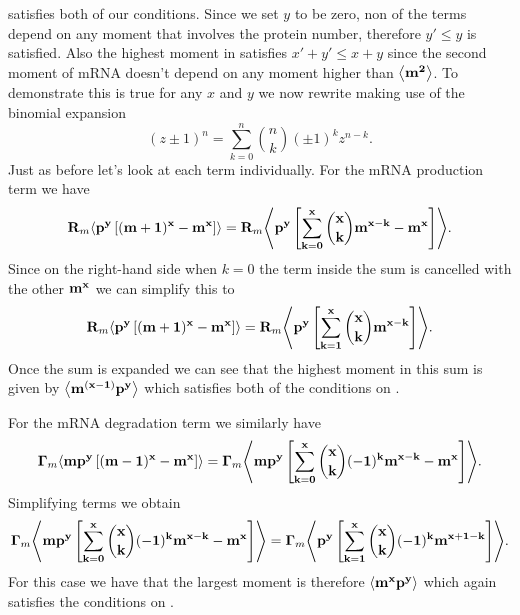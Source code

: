  satisfies both of our conditions. Since we set $y$ to
be zero, non of the terms depend on any moment that involves the protein number,
therefore $y' \leq y$ is satisfied. Also the highest moment in
  satisfies $x' + y' \leq x + y$ since the second
moment of mRNA doesn't depend on any moment higher than $\mathbf{\left\langle m^2 \right\rangle}$. To
demonstrate this is true for any $x$ and $y$ we now rewrite
 making use of the binomial expansion
\begin{equation}
  (z \pm 1)^n = \sum_{k=0}^n {n \choose k} (\pm 1)^{k} z^{n-k}.
\end{equation}
Just as before let's look at each term individually. For the mRNA production
term we have
\begin{equation}
  \mathbf{R}_m \mathbf{\left\langle p^y \left[ (m + 1)^x -m^x \right] \right\rangle} =
  \mathbf{R}_m \mathbf{\left\langle p^y \left[ \sum_{k=0}^x {x \choose k} m^{x-k} - m^x \right] \right\rangle}.
\end{equation}
Since on the right-hand side when $k=0$ the term inside the sum is cancelled with the other $\mathbf{m^x}$ we can simplify
this to
\begin{equation}
  \mathbf{R}_m \mathbf{\left\langle p^y \left[ (m + 1)^x -m^x \right] \right\rangle} =
  \mathbf{R}_m \mathbf{\left\langle p^y \left[ \sum_{k=1}^x {x \choose k} m^{x-k} \right] \right\rangle}.
\end{equation}
Once the sum is expanded we can see that the highest moment in this sum is given
by $\mathbf{\left\langle m^{(x-1)} p^y \right\rangle}$ which satisfies both of the conditions on
.

For the mRNA degradation term we similarly have
\begin{equation}
  \mathbf{\Gamma}_m \mathbf{\left\langle m p^y \left[ (m - 1)^x - m^x \right] \right\rangle} =
  \mathbf{\Gamma}_m \mathbf{\left\langle m p^y \left[ \sum_{k=0}^x {x \choose k}(-1)^k m^{x-k} -
                          m^x \right] \right\rangle}.
\end{equation}
Simplifying terms we obtain
\begin{equation}
  \mathbf{\Gamma}_m \mathbf{\left\langle m p^y \left[ \sum_{k=0}^x {x \choose k}(-1)^k m^{x-k} -
                          m^x \right] \right\rangle} =
  \mathbf{\Gamma}_m \mathbf{\left\langle p^y \left[ \sum_{k=1}^x {x \choose k}(-1)^k m^{x+1-k} \right] \right\rangle}.
\end{equation}
For this case we have that the largest moment is therefore $\mathbf{\left\langle m^x p^y  \right\rangle}$
which again satisfies the conditions on .

